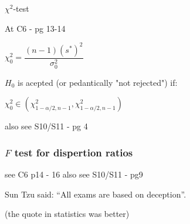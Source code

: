 \documentclass[11pt]{article}
\begin{document}
\(\chi^2\)-test

At C6 - pg 13-14
\medskip

\(\chi^2_0 = \dfrac{(n-1) (s^*)^2}{\sigma_0^2} \)
\medskip

\(H_0\) is acepted (or pedantically  "not rejected") if:

\( \chi^2_0 \in (\chi^2_{1-\alpha/2, n-1}, \chi^2_{1-\alpha/2, n-1}) \)

\medskip
also see S10/S11 - pg 4

\subsubsection*{\(F\) test for dispertion ratios}
\label{sec:org281398a}
see C6 p14 - 16
also see S10/S11 - pg9
\bigskip

Sun Tzu said: “All exams are based on deception”.

(the quote in statistics was better)
\end{document}

